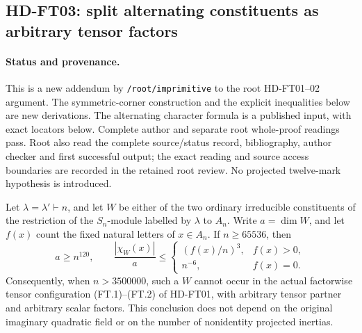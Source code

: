 \subsection{HD-FT03: split alternating constituents as arbitrary tensor factors}
\label{sec:split-alternating-factor}

\paragraph{Status and provenance.}
This is a new addendum by \texttt{/root/imprimitive} to the root
HD-FT01--02 argument.  The symmetric-corner construction and the
explicit inequalities below are new derivations.  The alternating
character formula is a published input, with exact locators below.
Complete author and separate root whole-proof readings pass. Root
also read the complete source/status record, bibliography, author
checker and first successful output; the exact reading and source
access boundaries are recorded in the retained root review.
No projected twelve-mark hypothesis is introduced.

\begin{theorem}[HD-FT03]
Let \(\lambda=\lambda'\vdash n\), and let \(W\) be either of the
two ordinary irreducible constituents of the restriction of the
\(S_n\)-module labelled by \(\lambda\) to \(A_n\).
Write \(a=\dim W\), and let \(f(x)\) count the fixed natural letters
of \(x\in A_n\).  If \(n\ge65536\), then
\[
 a\ge n^{120},\qquad
 \frac{|\chi_W(x)|}{a}\le
 \begin{cases}
       (f(x)/n)^3,&f(x)>0,\\
       n^{-6},&f(x)=0 .
 \end{cases}
 \tag{FTS.1}
\]
Consequently, when \(n>3500000\), such a \(W\) cannot occur in the
actual factorwise tensor configuration (FT.1)--(FT.2) of HD-FT01,
with arbitrary tensor partner and arbitrary scalar factors.
This conclusion does not depend on the original imaginary
quadratic field or on the number of nonidentity projected inertias.
\end{theorem}

